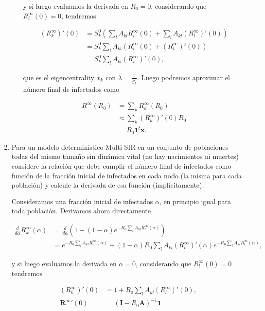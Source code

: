 \documentclass[answers]{exam}
\begin{document}
\begin{questions}
\begin{enumerate}
\begin{enumerate}
\begin{solution}
y si luego evaluamos la derivada en $R_0 = 0$, considerando que $R_l^\infty(0) = 0$, tendremos

\begin{align*}
    (R_k^\infty)'(0) &= S_k^0\left(\sum_lA_{kl}R_l^\infty(0) + \sum_lA_{kl}(R_l^\infty)'(0)\right)\\
    &= S_k^0\sum_lA_{kl}\left(R_l^\infty(0) + (R_l^\infty)'(0)\right)\\
    &= S_k^0\sum_lA_{kl}(R_l^\infty)'(0),
\end{align*}

que es el eigencentrality $x_k$ con $\lambda = \frac{1}{S_k^0}$. Luego podremos aproximar el número final de infectados como

\begin{align*}
    R^\infty(R_0) &= \sum_kR^\infty_k(R_0)\\
    &\approx \sum_k(R^\infty_k)'(0)R_0\\
    &= R_0\mathbf{1}^t\mathbf{x}.
\end{align*}
\end{solution}

\end{enumerate}

\item Para un modelo determinístico Multi-SIR en un conjunto de poblaciones todas del mismo tamaño sin dinámica vital (no hay nacimientos ni muertes) considere la relación que debe cumplir el número final de infectados como función de la fracción inicial de infectados en cada nodo (la misma para cada población) y calcule la derivada de esa función (implícitamente).

\begin{solution}
Consideramos una fracción inicial de infectados $\alpha$, en principio igual para toda población. Derivamos ahora directamente

\begin{align*}
    \frac{d}{d\alpha}R_k^\infty(\alpha) &= \frac{d}{d\alpha}\left(1 - (1 - \alpha)e^{-R_0\sum_lA_{kl}R_l^\infty(\alpha)}\right)\\
    &= e^{-R_0\sum_lA_{kl}R_l^\infty(\alpha)} + (1 - \alpha)R_0\sum_lA_{kl}(R_l^\infty)'(\alpha)e^{-R_0\sum_lA_{kl}R_l^\infty(\alpha)},
\end{align*}

y si luego evaluamos la derivada en $\alpha = 0$, considerando que $R_l^\infty(0) = 0$ tendremos

\begin{align*}
    (R_k^\infty)'(0) &= 1 + R_0\sum_lA_{kl}(R_l^\infty)'(0),\\
    \mathbf{R^\infty}'(0) &= (\mathbf{I} - R_0\mathbf{A})^{-1}\mathbf{1}
\end{align*}


\end{solution}
\end{enumerate}
\end{questions}
\end{document}
